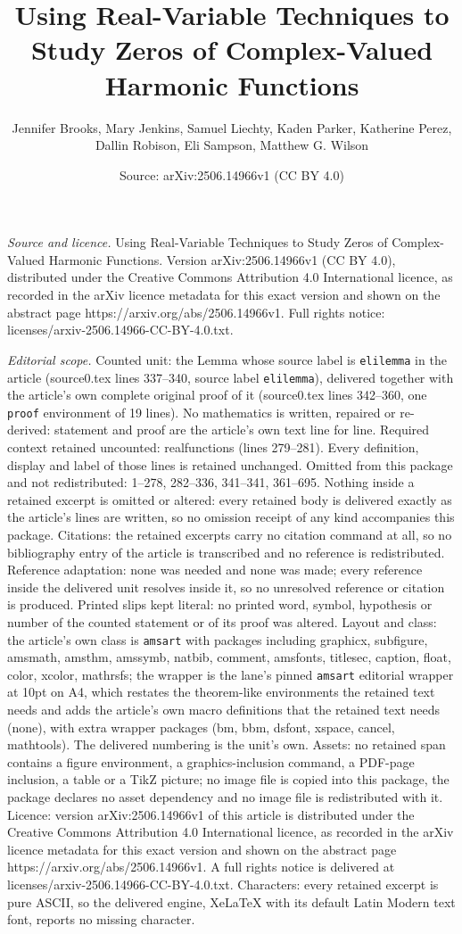 \documentclass[10pt,a4paper]{amsart}
\title[Using Real-Variable Techniques to Study Zeros of Complex-Val]{Using Real-Variable Techniques to Study Zeros of Complex-Valued Harmonic Functions}
\author{Jennifer Brooks, Mary Jenkins, Samuel Liechty, Kaden Parker, Katherine Perez, Dallin Robison, Eli Sampson, Matthew G. Wilson}
\date{Source: arXiv:2506.14966v1 (CC BY 4.0)}
\begin{document}
\maketitle

\noindent\emph{Source and licence.} Using Real-Variable Techniques to Study Zeros of Complex-Valued Harmonic Functions. Version arXiv:2506.14966v1 (CC BY 4.0), distributed under the Creative Commons Attribution 4.0 International licence, as recorded in the arXiv licence metadata for this exact version and shown on the abstract page https://arxiv.org/abs/2506.14966v1. Full rights notice: licenses/arxiv-2506.14966-CC-BY-4.0.txt.\par\smallskip

\noindent\textit{Editorial scope.} Counted unit: the Lemma whose source label is \texttt{elilemma} in the article (source0.tex lines 337--340, source label \texttt{elilemma}), delivered together with the article's own complete original proof of it (source0.tex lines 342--360, one \texttt{proof} environment of 19 lines). No mathematics is written, repaired or re-derived: statement and proof are the article's own text line for line. Required context retained uncounted: realfunctions (lines 279--281). Every definition, display and label of those lines is retained unchanged. Omitted from this package and not redistributed: 1--278, 282--336, 341--341, 361--695. Nothing inside a retained excerpt is omitted or altered: every retained body is delivered exactly as the article's lines are written, so no omission receipt of any kind accompanies this package. Citations: the retained excerpts carry no citation command at all, so no bibliography entry of the article is transcribed and no reference is redistributed. Reference adaptation: none was needed and none was made; every reference inside the delivered unit resolves inside it, so no unresolved reference or citation is produced. Printed slips kept literal: no printed word, symbol, hypothesis or number of the counted statement or of its proof was altered. Layout and class: the article's own class is \texttt{amsart} with packages including graphicx, subfigure, amsmath, amsthm, amssymb, natbib, comment, amsfonts, titlesec, caption, float, color, xcolor, mathrsfs; the wrapper is the lane's pinned \texttt{amsart} editorial wrapper at 10pt on A4, which restates the theorem-like environments the retained text needs and adds the article's own macro definitions that the retained text needs (none), with extra wrapper packages (bm, bbm, dsfont, xspace, cancel, mathtools). The delivered numbering is the unit's own. Assets: no retained span contains a figure environment, a graphics-inclusion command, a PDF-page inclusion, a table or a TikZ picture; no image file is copied into this package, the package declares no asset dependency and no image file is redistributed with it. Licence: version arXiv:2506.14966v1 of this article is distributed under the Creative Commons Attribution 4.0 International licence, as recorded in the arXiv licence metadata for this exact version and shown on the abstract page https://arxiv.org/abs/2506.14966v1. A full rights notice is delivered at licenses/arxiv-2506.14966-CC-BY-4.0.txt. Characters: every retained excerpt is pure ASCII, so the delivered engine, XeLaTeX with its default Latin Modern text font, reports no missing character.
\end{document}
